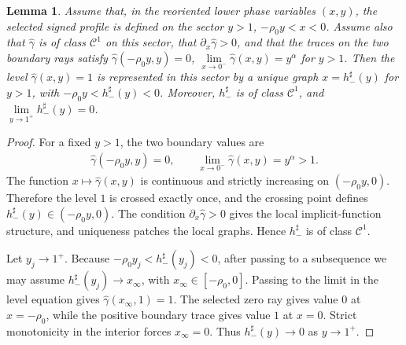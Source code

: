 \documentclass{amsart}
\theoremstyle{plain}
\newtheorem{lemma}[theorem]{Lemma}
\theoremstyle{mainintrothm}
\theoremstyle{definition}
\begin{document}
\begin{lemma}
	\label{lem:reflected-entry-sheet}
	Assume that, in the reoriented lower phase variables $(x,y)$, the selected
	signed profile is defined on the sector $y>1$, $-\rho_0y<x<0$.
	Assume also that $\widehat\gamma$ is of class $\mathcal C^1$ on this sector,
	that $\partial_x\widehat\gamma>0$, and that the traces on the two boundary
	rays satisfy $\widehat\gamma(-\rho_0y,y)=0$, $\lim\limits_{x\to0^-}\widehat\gamma(x,y)=y^\alpha$ for $y>1$. Then the level $\widehat\gamma(x,y)=1$ is represented in this sector by a
	unique graph $x=h_-^\sharp(y)$ for $y>1$, with
	$-\rho_0y<h_-^\sharp(y)<0$.  Moreover, $h_-^\sharp$ is of class
	$\mathcal C^1$, and $\lim\limits_{y\to1^+}h_-^\sharp(y)=0$.
\end{lemma}

\begin{proof}
	For a fixed $y>1$, the two boundary values are
	\begin{align*}
		\widehat\gamma(-\rho_0y,y)=0,
		\qquad
		\lim\limits_{x\to0^-}\widehat\gamma(x,y)=y^\alpha>1.
	\end{align*}
	The function $x\mapsto\widehat\gamma(x,y)$ is continuous and strictly
	increasing on $(-\rho_0y,0)$.  Therefore the level $1$ is crossed exactly
	once, and the crossing point defines
	$h_-^\sharp(y)\in(-\rho_0y,0)$.  The condition
	$\partial_x\widehat\gamma>0$ gives the local implicit-function structure, and
	uniqueness patches the local graphs.  Hence $h_-^\sharp$ is of class
	$\mathcal C^1$.
	
	\medskip
	
	Let $y_j\to1^+$.  Because $-\rho_0y_j<h_-^\sharp(y_j)<0$, after
	passing to a subsequence we may assume
	$h_-^\sharp(y_j)\to x_\infty$, with $x_\infty\in[-\rho_0,0]$.  Passing to
	the limit in the level equation gives $\widehat\gamma(x_\infty,1)=1$.  The
	selected zero ray gives value $0$ at $x=-\rho_0$, while the positive boundary
	trace gives value $1$ at $x=0$.  Strict monotonicity in the interior forces
	$x_\infty=0$.  Thus $h_-^\sharp(y)\to0$ as $y\to1^+$.
\end{proof}
\end{document}

